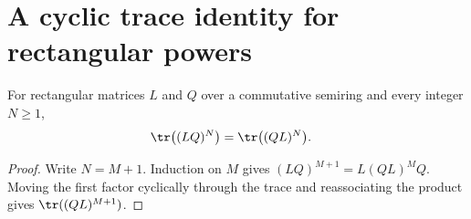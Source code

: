 \section{A cyclic trace identity for rectangular powers}

\begin{lemma}
    \label{lem:matrix_trace_pow_mul_comm}
    \leanok
    For rectangular matrices $L$ and $Q$ over a commutative semiring and every
    integer $N\geq1$,
    \begin{align}
        \tr\bigl((LQ)^N\bigr)&=\tr\bigl((QL)^N\bigr).
        \notag
    \end{align}
\end{lemma}

\begin{proof}
    \leanok
    Write $N=M+1$. Induction on $M$ gives
    $(LQ)^{M+1}=L(QL)^M Q$. Moving the first factor cyclically through the
    trace and reassociating the product gives $\tr((QL)^{M+1})$.
\end{proof}

